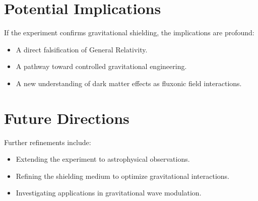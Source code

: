 \documentclass{article}
\begin{document}
\section{Potential Implications}
If the experiment confirms gravitational shielding, the implications are profound:
\begin{itemize}
    \item A direct falsification of General Relativity.
    \item A pathway toward controlled gravitational engineering.
    \item A new understanding of dark matter effects as fluxonic field interactions.
\end{itemize}

\section{Future Directions}
Further refinements include:
\begin{itemize}
    \item Extending the experiment to astrophysical observations.
    \item Refining the shielding medium to optimize gravitational interactions.
    \item Investigating applications in gravitational wave modulation.
\end{itemize}
\end{document}
